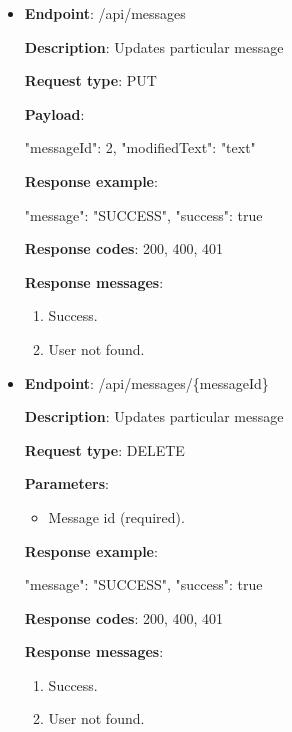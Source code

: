 \begin{itemize}
    \textbf{Response codes}: 200, 400, 401

    \textbf{Response messages}:
    \begin{enumerate}
        \item Success.
        \item User not found.
    \end{enumerate}

    \pagebreak

    \item \textbf{Endpoint}: /api/messages

    \textbf{Description}: Updates particular message

    \textbf{Request type}: PUT

    \textbf{Payload}:

    \begin{spverbatim}
    {
        "messageId": 2,
        "modifiedText": "text"
    }
    \end{spverbatim}

    \textbf{Response example}:

    \begin{spverbatim}
    {
        "message": "SUCCESS",
        "success": true
    }
    \end{spverbatim}

    \textbf{Response codes}: 200, 400, 401

    \textbf{Response messages}:
    \begin{enumerate}
        \item Success.
        \item User not found.
    \end{enumerate}

    \item \textbf{Endpoint}: /api/messages/\{messageId\}

    \textbf{Description}: Updates particular message

    \textbf{Request type}: DELETE

    \textbf{Parameters}:

    \begin{itemize}
        \item Message id (required).
    \end{itemize}

    \textbf{Response example}:

    \begin{spverbatim}
    {
        "message": "SUCCESS",
        "success": true
    }
    \end{spverbatim}

    \textbf{Response codes}: 200, 400, 401

    \textbf{Response messages}:
    \begin{enumerate}
        \item Success.
        \item User not found.
    \end{enumerate}
\end{itemize}

